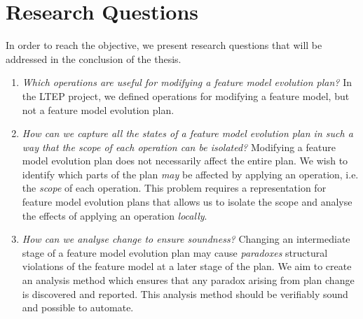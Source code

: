 
\section{Research Questions}
\label{sec:research-questions}

In order to reach the objective, we present research questions that will be addressed in the conclusion of the thesis.

\begin{enumerate}[\itbf{RQ\arabic*}, itemsep=0mm]
   \item \textit{Which operations are useful for modifying a feature model evolution plan?} In the LTEP project, we defined operations for modifying a feature model, but not a feature model evolution plan. \label{rq1}
   \item \textit{How can we capture all the states of a feature model evolution plan in such a way that the scope of each operation can be isolated?} Modifying a feature model evolution plan does not necessarily affect the entire plan. We wish to identify which parts of the plan \emph{may} be affected by applying an operation, i.e. the \emph{scope} of each operation. This problem requires a representation for feature model evolution plans that allows us to isolate the scope and analyse the effects of applying an operation \emph{locally}. \label{rq2}
   \item \textit{How can we analyse change to ensure soundness?} 
      Changing an intermediate stage of a feature model evolution plan may cause \emph{paradoxes} \textemdash{} structural violations of the feature model \textemdash{} at a later stage of the plan. 
      We aim to create an analysis method which ensures that any paradox arising from plan change is discovered and reported. This analysis method should be verifiably sound and possible to automate. \label{rq3}
\end{enumerate}

